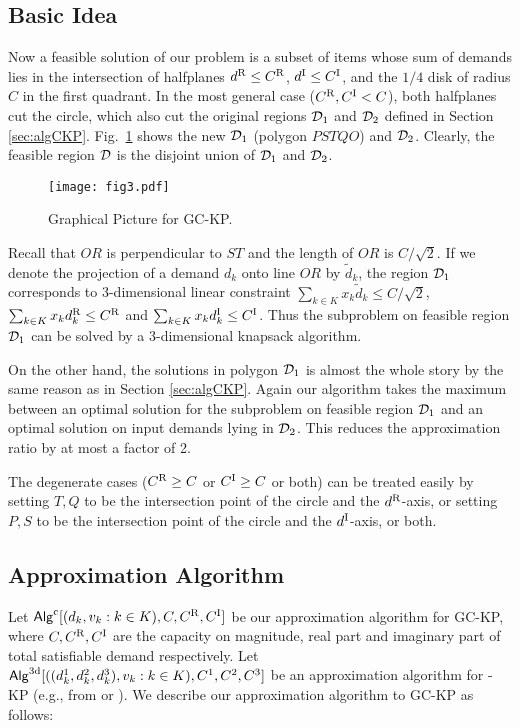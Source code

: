\documentclass{aamas2013}
\begin{document}
\subsection{Basic Idea} \label{subsec:picGen}
\noindent
Now a feasible solution of our problem is a subset of items whose sum of demands lies in the intersection of halfplanes $d^{\rm R}\leq C^{\rm R}$, $d^{\rm I}\leq C^{\rm I}$, and the $1/4$ disk of radius $C$ in the first quadrant.  In the most general case ($C^{\rm R}, C^{\rm I}<C$), both halfplanes cut the circle, which also cut the original regions ${\cal D}_1$ and ${\cal D}_2$ defined in Section \ref{sec:algCKP}.
Fig.~\ref{fig:fig3} shows the new ${\cal D}_1$ (polygon $PSTQO$) and ${\cal D}_2$.  Clearly, the feasible region ${\cal D}$ is the disjoint union of ${\cal D}_1$ and ${\cal D}_2$.  

\begin{figure}[htb!]
 \centering 
 \texttt{[image: fig3.pdf]} \caption{Graphical Picture for GC-KP.} \label{fig:fig3}
\end{figure}

Recall that $OR$ is perpendicular to $ST$ and the length of $OR$ is $C/\sqrt{2}$.  If we denote the projection of a demand $d_k$ onto line $OR$ by $\tilde{d}_k$, the region ${\cal D}_1$ corresponds to 3-dimensional linear constraint $\sum_{k\in K} x_k\tilde{d}_k\leq C/\sqrt{2}$,
$\sum_{k\in K}x_kd_k^{\rm R}\leq C^{\rm R}$ and $\sum_{k\in K}x_kd_k^{\rm I}\leq C^{\rm I}$.  Thus the subproblem on feasible region ${\cal D}_1$ can be solved by a 3-dimensional knapsack algorithm.   

On the other hand, the solutions in polygon ${\cal D}_1$ is almost the whole story by the same reason as in Section \ref{sec:algCKP}.  Again our algorithm takes the maximum between an optimal solution for the subproblem on feasible region ${\cal D}_1$ and an optimal solution on input demands lying in ${\cal D}_2$. This reduces the approximation ratio by at most a factor of 2.


The degenerate cases ($C^{\rm R}\geq C$ or $C^{\rm I}\geq C$ or both) can be treated easily by setting $T,Q$ to be the intersection point of the circle and the $d^{\rm R}$-axis, or setting $P,S$ to be the intersection point of the circle and the $d^{\rm I}$-axis, or both.  

\subsection{Approximation Algorithm}
\noindent
Let ${\sf Alg}^{\rm c} [(d_k,v_k: k \in K), C,C^{\rm R},C^{\rm I}]$ be our approximation algorithm for {\sc GC-KP}, where $C,C^{\rm R},C^{\rm I}$ are the capacity on magnitude, real part and imaginary part of total satisfiable demand respectively. Let ${\sf Alg}^{\rm 3d}[((d^1_k, d^2_k, d^3_k),v_k: k \in K), C^1, C^2, C^3]$ be an approximation algorithm for {-KP} (e.g., from \cite{FC84alg} or \cite{KPP10book}).   
We describe our approximation algorithm to {\sc GC-KP} as follows:
\end{document}
